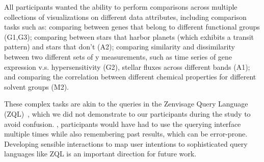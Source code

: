 \par All participants wanted the ability to perform comparisons across multiple collections of visualizations on different data attributes, including comparison tasks such as:
comparing between genes that belong to different functional groups (G1,G3); 
comparing between stars that harbor planets (which exhibits a transit pattern) and stars that don't (A2);
comparing similarity and dissimilarity between two different sets of y measurements, such as time series of gene expression v.s. hypersensitivity (G2), stellar fluxes across different bands (A1); and comparing the correlation between different chemical properties for different solvent groups (M2).
\par These complex tasks are akin to the queries in the Zenvisage Query Language (ZQL)~\cite{Siddiqui2017}, which we did not demonstrate to our participants during the study to avoid confusion. ,  participants would have had to use the querying interface multiple times while also remembering past results, which can be error-prone. Developing sensible interactions to map user intentions to sophisticated query languages like ZQL is an important direction for future work. 


